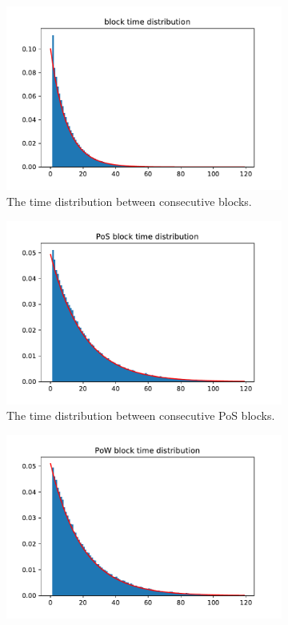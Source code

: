 \documentclass[a4paper]{article}
\begin{document}
\begin{figure}
    \centering
    \begin{subfigure}[b]{0.3\textwidth}
        \includegraphics[width=\textwidth]{assets/block-time.pdf}
        \caption{The time distribution between consecutive blocks.}
    \end{subfigure}
    \begin{subfigure}[b]{0.3\textwidth}
        \includegraphics[width=\textwidth]{assets/pos-block-time.pdf}
        \caption{The time distribution between consecutive PoS blocks.}
    \end{subfigure}
    \begin{subfigure}[b]{0.3\textwidth}
        \includegraphics[width=\textwidth]{assets/pow-block-time.pdf}

\end{subfigure}
\end{figure}
\end{document}
